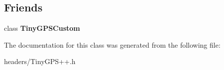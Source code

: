 \subsection*{Friends}
\begin{DoxyCompactItemize}
\item 
class {\bfseries Tiny\+G\+P\+S\+Custom}\hypertarget{class_tiny_g_p_s_plus_aaad5bf5a2728a81e624ad2304f817772}{}\label{class_tiny_g_p_s_plus_aaad5bf5a2728a81e624ad2304f817772}

\end{DoxyCompactItemize}


The documentation for this class was generated from the following file\+:\begin{DoxyCompactItemize}
\item 
headers/Tiny\+G\+P\+S++.\+h\end{DoxyCompactItemize}
